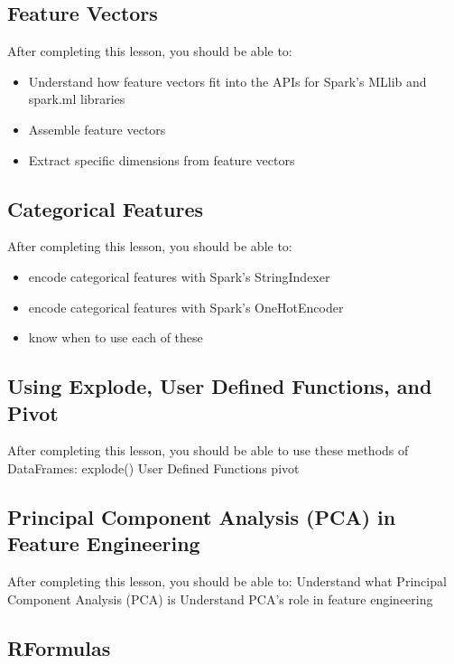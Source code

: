 \subsection{Feature Vectors}

After completing this lesson, you should be able to:
\begin{itemize}
\item Understand how feature vectors fit into the APIs for Spark's MLlib and spark.ml libraries
\item Assemble feature vectors
\item Extract specific dimensions from feature vectors
\end{itemize}
\subsection{Categorical Features}

After completing this lesson, you should be able to:
\begin{itemize}
\item encode categorical features with Spark's StringIndexer
\item encode categorical features with Spark's OneHotEncoder
\item know when to use each of these
\end{itemize}

\subsection{Using Explode, User Defined Functions, and Pivot}

After completing this lesson, you should be able to use these methods of DataFrames:
explode()
User Defined Functions
pivot

\subsection{Principal Component Analysis (PCA) in Feature Engineering}

After completing this lesson, you should be able to:
Understand what Principal Component Analysis (PCA) is
Understand PCA’s role in feature engineering

\subsection{RFormulas}

